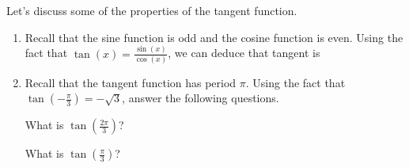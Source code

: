 \documentclass{ximera}
\author{Kenneth Berglund}
\begin{document}
\begin{exercise}
Let's discuss some of the properties of the tangent function. 

\begin{enumerate}
\item Recall that the sine function is odd and the cosine function is even. Using the fact that $\tan(x) = \frac{\sin(x)}{\cos(x)}$, we can deduce that tangent is
\begin{multipleChoice}
\end{multipleChoice}

\item Recall that the tangent function has period $\pi$. Using the fact that $\tan\left(-\frac{\pi}{3}\right) = -\sqrt{3}$, answer the following questions.

What is $\tan\left(\frac{2\pi}{3}\right)$?
\begin{multipleChoice}
\end{multipleChoice}

What is $\tan\left(\frac{\pi}{3}\right)$?
\begin{multipleChoice}
\end{multipleChoice}
\end{enumerate}

\end{exercise}
\end{document}

